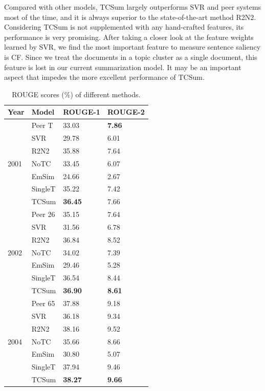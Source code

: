 \documentclass[letterpaper]{article}
\begin{document}
Compared with other models, TCSum largely outperforms SVR and peer systems most of the time, and it is always superior to the state-of-the-art method R2N2.
Considering TCSum is not supplemented with any hand-crafted features, its performance is very promising.
After taking a closer look at the feature weights learned by SVR, we find the most important feature to measure sentence saliency is CF.
Since we treat the documents in a topic cluster as a single document, this feature is lost in our current summarization model.
It may be an important aspect that impedes the more excellent performance of TCSum.


\begin{table}[]
\centering
\small
\begin{tabular}{l|lll}
\hline
Year                  & Model   & ROUGE-1 & ROUGE-2 \\ \hline
\multirow{7}{*}{2001} & Peer T  & 33.03   & \textbf{7.86}    \\
& SVR     & 29.78   & 6.01    \\
& R2N2    & 35.88   & 7.64    \\ \cline{2-4}
& NoTC    & 33.45   & 6.07    \\
& EmSim   & 24.66   & 2.67    \\
& SingleT & 35.22   & 7.42    \\
& TCSum   & \textbf{36.45}   & 7.66    \\ \hline
\multirow{7}{*}{2002} & Peer 26 & 35.15   & 7.64    \\
& SVR     & 31.56   & 6.78    \\
& R2N2    & 36.84   & 8.52    \\ \cline{2-4}
& NoTC    & 34.02   & 7.39    \\
& EmSim   & 29.46   & 5.28    \\
& SingleT & 36.54   & 8.44    \\
& TCSum   & \textbf{36.90}   & \textbf{8.61}    \\ \hline
\multirow{7}{*}{2004} & Peer 65 & 37.88   & 9.18    \\
& SVR     & 36.18   & 9.34    \\
& R2N2    & 38.16   & 9.52    \\ \cline{2-4}
& NoTC    & 35.66   & 8.66    \\
& EmSim   & 30.80   & 5.07    \\
& SingleT & 37.94   & 9.46    \\
& TCSum   & \textbf{38.27}   & \textbf{9.66}    \\ \hline
\end{tabular}
\caption{ROUGE scores (\%) of different methods.}
\label{tb:rouge}
\end{table}
\end{document}
